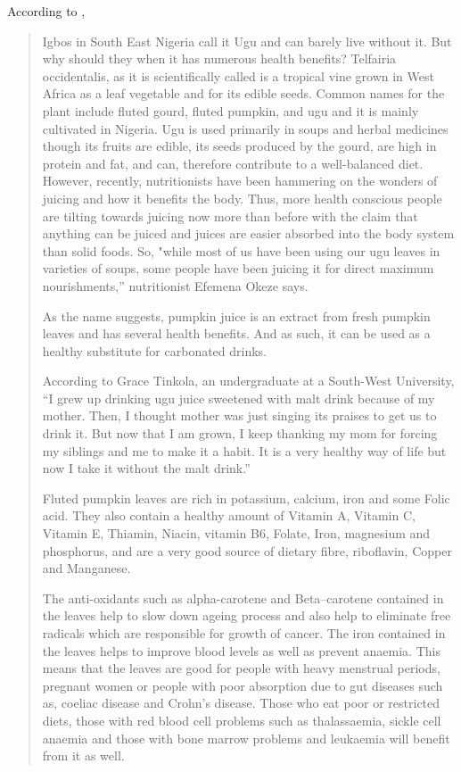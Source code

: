 According to , \citep{olagunjuFlutedPumpkinLeaf2016} \begin{quotation}
	Igbos in South East Nigeria call it Ugu and can barely live without it. But why should they when it has numerous health benefits?
	Telfairia occidentalis, as it is scientifically called is a tropical vine grown in West Africa as a leaf vegetable and for its edible seeds. Common names for the plant include fluted gourd, fluted pumpkin, and ugu and it is mainly cultivated in Nigeria. Ugu is used primarily in soups and herbal medicines though its fruits are edible, its seeds produced by the gourd, are high in protein and fat, and can, therefore contribute to a well-balanced diet.
	However, recently, nutritionists have been hammering on the wonders of juicing and how it benefits the body. Thus, more health conscious people are tilting towards juicing now more than before with the claim that anything can be juiced and juices are easier absorbed into the body system than solid foods. So, "while most of us have been using our ugu leaves in varieties of soups, some people have been juicing it for direct maximum nourishments,” nutritionist Efemena Okeze says.
	
	As the name suggests, pumpkin juice is an extract from fresh pumpkin leaves and has several health benefits. And as such, it can be used as a healthy substitute for carbonated drinks.
	
	According to Grace Tinkola, an undergraduate at a South-West University, “I grew up drinking ugu juice sweetened with malt drink because of my mother. Then, I thought mother was just singing its praises to get us to drink it. But now that I am grown, I keep thanking my mom for forcing my siblings and me to make it a habit. It is a very healthy way of life but now I take it without the malt drink.”
	
	Fluted pumpkin leaves are rich in potassium, calcium, iron and some Folic acid. They also contain a healthy amount of Vitamin A, Vitamin C, Vitamin E, Thiamin, Niacin, vitamin B6, Folate, Iron, magnesium and phosphorus, and are a very good source of dietary fibre, riboflavin, Copper and Manganese.
	
	The anti-oxidants such as alpha-carotene and Beta–carotene contained in the leaves help to slow down ageing process and also help to eliminate free radicals which are responsible for growth of cancer. The iron contained in the leaves helps to improve blood levels as well as prevent anaemia. This means that the leaves are good for people with heavy menstrual periods, pregnant women or people with poor absorption due to gut diseases such as, coeliac disease and Crohn’s disease. Those who eat poor or restricted diets, those with red blood cell problems such as thalassaemia, sickle cell anaemia and those with bone marrow problems and leukaemia will benefit from it as well.
	

\end{quotation}
